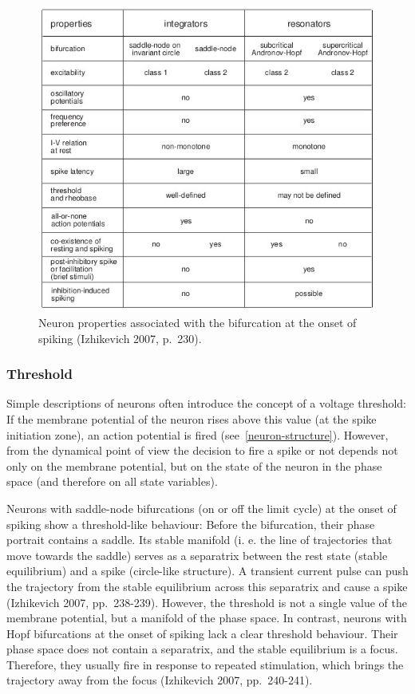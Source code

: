 \documentclass[12pt,a4paper,]{report}
\begin{document}
\begin{figure}
\centering
\includegraphics[width=0.700\hsize]{images/Izhikevich_2007_p_230.jpg}
\caption[Neuron properties associated with the bifurcation at the
onset of spiking]{Neuron properties associated with the bifurcation at the
onset of spiking (Izhikevich 2007,
p.~230).}\label{bifurcation-properties}
\end{figure}

\subsubsection{Threshold}\label{threshold}

Simple descriptions of neurons often introduce the concept of a voltage
threshold: If the membrane potential of the neuron rises above this
value (at the spike initiation zone), an action potential is fired
(see~\ref{neuron-structure}). However, from the dynamical point of view
the decision to fire a spike or not depends not only on the membrane
potential, but on the state of the neuron in the phase space (and
therefore on all state variables).

Neurons with saddle-node bifurcations (on or off the limit cycle) at the
onset of spiking show a threshold-like behaviour: Before the
bifurcation, their phase portrait contains a saddle. Its stable manifold
(i. e. the line of trajectories that move towards the saddle) serves as
a separatrix between the rest state (stable equilibrium) and a spike
(circle-like structure). A transient current pulse can push the
trajectory from the stable equilibrium across this separatrix and cause
a spike (Izhikevich 2007, pp.~238-239). However, the threshold is not a
single value of the membrane potential, but a manifold of the phase
space. In contrast, neurons with Hopf bifurcations at the onset of
spiking lack a clear threshold behaviour. Their phase space does not
contain a separatrix, and the stable equilibrium is a focus. Therefore,
they usually fire in response to repeated stimulation, which brings the
trajectory away from the focus (Izhikevich 2007, pp.~240-241).
\end{document}
